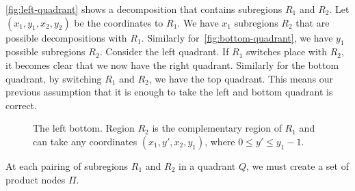 \documentclass{amsart}
\theoremstyle{plain}
\numberwithin{equation}{section}
\begin{document}
\autoref{fig:left-quadrant} shows a decomposition that contains subregions $R_1$ and $R_2$. Let
$(x_1,y_1,x_2,y_2)$ be the coordinates to $R_1$. We have $x_1$ subregions $R_2$ that are possible
decompositions with $R_1$. Similarly for~\autoref{fig:bottom-quadrant}, we have $y_1$ possible
subregions $R_2$. Consider the left quadrant. If $R_1$ switches place with $R_2$, it becomes clear
that we now have the right quadrant. Similarly for the bottom quadrant, by switching $R_1$ and
$R_2$, we have the top quadrant. This means our previous assumption that it is enough to take the
left and bottom quadrant is correct.

\begin{figure}[h]
  \centering
  \captionsetup{justification=raggedright}
  \caption{The left bottom. Region $R_2$ is the complementary region of $R_1$ and can take any
  coordinates $(x_1,y',x_2,y_1)$, where $0\leq y'\leq y_1-1$.\label{fig:bottom-quadrant}}
\end{figure}

At each pairing of subregions $R_1$ and $R_2$ in a quadrant $Q$, we must create a set of product
nodes $\Pi$.


\printbibliography[]
\end{document}
